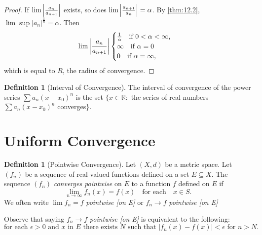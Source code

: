 \documentclass[12pt, lettersize]{book}
\theoremstyle{plain}
\theoremstyle{definition}
\newtheorem{dfn}[thm]{Definition}
\theoremstyle{remark}
\newcommand{\R}{\mathbb{R}}
\begin{document}
			\begin{proof}
				 If $\lim\abs{\frac{a_n}{a_{n+1}}}$ exists, so does $\lim\abs{\frac{a_{n+1}}{a_n}}=\alpha$. By \ref{thm:12.2}, $\lim\sup|a_n|^\frac{1}{n}=\alpha$. Then
				 \begin{displaymath}
				 	\lim\abs{\frac{a_n}{a_{n+1}}}\begin{cases}
				 		\frac{1}{\alpha}\quad\text{if $0<\alpha<\infty$,}\\
				 		\infty\quad\text{if $\alpha=0$}\\
				 		0\quad\text{if $\alpha=\infty$,}
				 	\end{cases}
				 \end{displaymath}
			 	which is equal to $R$, the radius of convergence.
			\end{proof}
			
			\begin{dfn}[Interval of Convergence]
			The interval of convergence of the power series $\sum a_n(x-x_0)^n$ is the set $\{x\in\R:$ the series of real numbers $\sum a_n(x-x_0)^n$ converges$\}$.
			\end{dfn}
			\newpage
		\section{Uniform Convergence}
			\begin{dfn}[Pointwise Convergence]
			Let $(X,d)$ be a metric space. Let $(f_n)$ be a sequence of real-valued functions defined on a set $E\subseteq X$. The sequence $(f_n)$ \emph{converges pointwise} on $E$ to a function $f$ defined on $E$ if
			\begin{displaymath}
				\lim\limits_{n\rightarrow\infty}f_n(x)=f(x)\quad\text{for each}\quad x\in S.
			\end{displaymath}
			We often write $\lim f_n=f$ \emph{pointwise [on E]} or $f_n\rightarrow f$ \emph{pointwise [on E]}
			\end{dfn}
			Observe that saying $f_n\rightarrow f$ \emph{pointwise [on E]} is equivalent to the following:
			\begin{displaymath}
				\text{for each $\epsilon>0$ and $x$ in $E$ there exists $N$ such that $|f_n(x)-f(x)|<\epsilon$ for $n>N$.}
			\end{displaymath}
			
\end{document}
